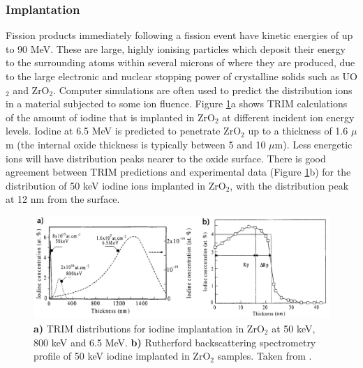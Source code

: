 \subsubsection{Implantation}

Fission products immediately following a fission event have kinetic energies of up to 90 MeV. These are large, highly ionising particles which deposit their energy to the surrounding atoms within several microns of where they are produced, due to the large electronic and nuclear stopping power of crystalline solids such as UO$_{2}$ and ZrO$_{2}$. Computer simulations are often used to predict the distribution ions in a material subjected to some ion fluence. Figure \ref{figure:srimtrim}a shows TRIM calculations of the amount of iodine that is implanted in ZrO$_{2}$ at different incident ion energy levels. Iodine at 6.5 MeV is predicted to penetrate ZrO$_{2}$ up to a thickness of 1.6 $\mu$m (the internal oxide thickness is typically between 5 and 10 $\mu$m). Less energetic ions will have distribution peaks nearer to the oxide surface. There is good agreement between TRIM predictions and experimental data (Figure \ref{figure:srimtrim}b) for the distribution of 50 keV iodine ions implanted in ZrO$_{2}$, with the distribution peak at 12 nm from the surface.

\begin{figure}[ht] %
\centering
\includegraphics[width=\linewidth]{images/srimtrim.png}
\caption[\textbf{a)} TRIM distributions for iodine implantation in ZrO$_{2}$ at 50 keV, 800 keV and 6.5 MeV. \textbf{b)} Rutherford backscattering spectrometry profile of 50 keV iodine implanted in ZrO$_{2}$ samples.]{\textbf{a)} TRIM distributions for iodine implantation in ZrO$_{2}$ at 50 keV, 800 keV and 6.5 MeV. \textbf{b)} Rutherford backscattering spectrometry profile of 50 keV iodine implanted in ZrO$_{2}$ samples. Taken from \cite{brossard1998use}.}
\label{figure:srimtrim}
\end{figure}


